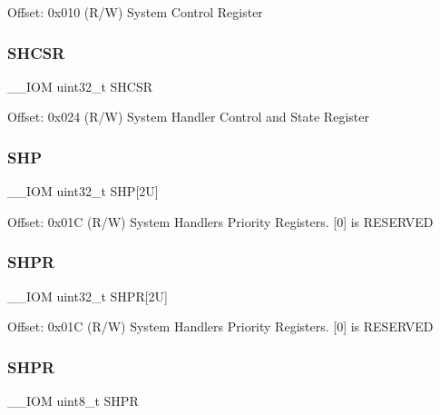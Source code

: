 Offset\+: 0x010 (R/W) System Control Register \mbox{\label{struct_s_c_b___type_a44ad5c292dbd77e72f310902375a8a06}} 
\subsubsection{\texorpdfstring{SHCSR}{SHCSR}}
{\footnotesize\ttfamily \+\_\+\+\_\+\+I\+OM uint32\+\_\+t S\+H\+C\+SR}

Offset\+: 0x024 (R/W) System Handler Control and State Register \mbox{\label{struct_s_c_b___type_a9976ebb49caa4da93e1dad137071b9ee}} 
\subsubsection{\texorpdfstring{SHP}{SHP}}
{\footnotesize\ttfamily \+\_\+\+\_\+\+I\+OM uint32\+\_\+t S\+HP\mbox{[}2\+U\mbox{]}}

Offset\+: 0x01C (R/W) System Handlers Priority Registers. \mbox{[}0\mbox{]} is R\+E\+S\+E\+R\+V\+ED \mbox{\label{struct_s_c_b___type_a67fd6058e3196a723d64df2d22ae6daa}} 
\subsubsection{\texorpdfstring{SHPR}{SHPR}\hspace{0.1cm}{\footnotesize\ttfamily [1/2]}}
{\footnotesize\ttfamily \+\_\+\+\_\+\+I\+OM uint32\+\_\+t S\+H\+PR\mbox{[}2\+U\mbox{]}}

Offset\+: 0x01C (R/W) System Handlers Priority Registers. \mbox{[}0\mbox{]} is R\+E\+S\+E\+R\+V\+ED \mbox{\label{struct_s_c_b___type_a7ad5506df4709580091a9af0a9f6a28e}} 
\subsubsection{\texorpdfstring{SHPR}{SHPR}\hspace{0.1cm}{\footnotesize\ttfamily [2/2]}}
{\footnotesize\ttfamily \+\_\+\+\_\+\+I\+OM uint8\+\_\+t S\+H\+PR}

